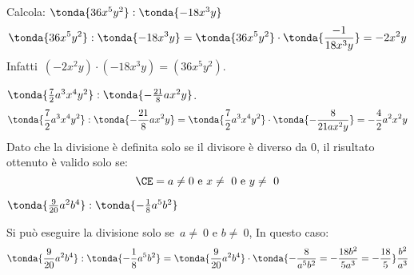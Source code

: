 \begin{exrig}
 \begin{esempio}
Calcola: \(\tonda{36x^{5}y^{2}}:\tonda{-18x^{3}y}\)
\[\tonda{36x^{5}y^{2}}:\tonda{-18x^{3}y} =
\tonda{36x^{5}y^{2}} \cdot \tonda{\frac{-1}{18x^{3}y}} =-2x^{2}y\]
Infatti~\((-2x^{2}y)\cdot(-18x^{3}y)=(36x^{5}y^{2})\).
 \end{esempio}
% 
% 
% 
 \begin{esempio}
\(\tonda{\frac{7}{2}a^{3}x^{4}y^{2}}:\tonda{-\frac{21}{8}ax^{2}y}\).
\[\tonda{\frac{7}{2}a^{3}x^{4}y^{2}}:\tonda{-\frac{21}{8}ax^{2}y} =
  \tonda{\frac{7}{2}a^{3}x^{4}y^{2}}\cdot \tonda{-\frac{8}{21ax^{2}y}} =
-\frac{4}{2}a^{2}x^{2}y\]
Dato che la divisione è definita solo se il divisore è diverso da 0, il 
risultato ottenuto è valido solo se:
\[\CE=a\neq0\text{ e }x\neq~0\text{ e }y\neq~0\]
 \end{esempio}

 \begin{esempio}
\(\tonda{\frac{9}{20}a^{2}b^{4}}:\tonda{-{\frac{1}{8}}a^{5}b^{2}}\)

Si può eseguire la divisione solo se~\(a\neq~0\text{ e }b\neq~0\), 
In questo caso:
\[\tonda{\frac{9}{20}a^{2}b^{4}}:\tonda{-{\frac{1}{8}}a^{5}b^{2}} =
\tonda{\frac{9}{20}a^{2}b^{4}} \cdot \tonda{-\frac{8}{a^{5}b^{2}} =
-\frac{18b^2}{5a^3} = -\frac{18}{5}}\frac{b^2}{a^3}\]
 \end{esempio}
\end{exrig}



